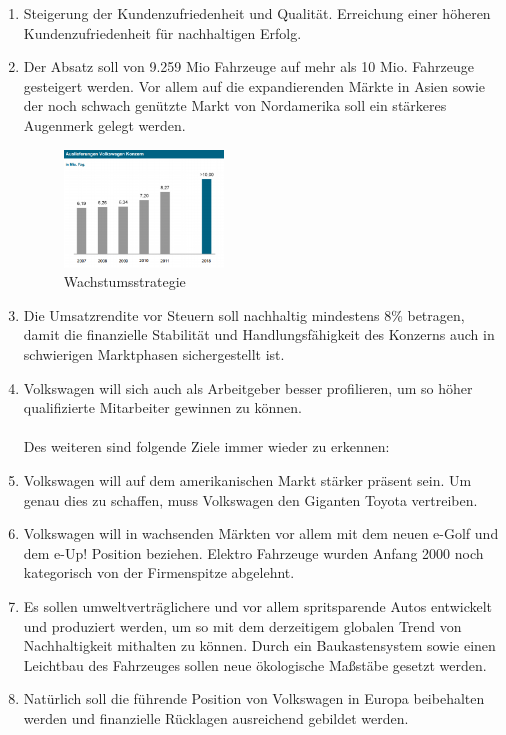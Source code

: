 \documentclass[12pt]{article}
\begin{document}
\begin{enumerate}
\item Steigerung der Kundenzufriedenheit und Qualität. Erreichung einer höheren Kundenzufriedenheit für nachhaltigen Erfolg.
\item Der Absatz soll von 9.259 Mio Fahrzeuge auf mehr als 10 Mio. Fahrzeuge gesteigert werden.  Vor allem auf die expandierenden Märkte in Asien sowie der noch schwach genützte Markt von Nordamerika soll ein stärkeres Augenmerk gelegt werden.
\begin{figure}[here!]
\centering
\includegraphics[width=0.4\textwidth]{images/strategie}
\caption{ Wachstumsstrategie \cite{vwamstrategie3}}
\end{figure}\FloatBarrier
\noindent
\item Die Umsatzrendite vor Steuern soll nachhaltig mindestens 8\% betragen, damit die finanzielle Stabilität und Handlungsfähigkeit des Konzerns auch in schwierigen Marktphasen sichergestellt ist. 
\item Volkswagen will sich auch als Arbeitgeber besser profilieren, um so höher qualifizierte Mitarbeiter gewinnen zu können.  \\\\
Des weiteren sind folgende Ziele immer wieder zu erkennen: \\
\item Volkswagen will auf dem amerikanischen Markt stärker präsent sein. Um genau dies zu schaffen, muss Volkswagen den Giganten Toyota vertreiben. \cite{ec1}
\item Volkswagen will in wachsenden Märkten vor allem mit dem neuen e-Golf und dem e-Up! Position beziehen. Elektro Fahrzeuge wurden Anfang 2000 noch kategorisch von der Firmenspitze abgelehnt. \cite{ec3} 
\item Es sollen umweltverträglichere und vor allem spritsparende Autos entwickelt und produziert werden, um so mit dem derzeitigem globalen Trend von Nachhaltigkeit mithalten zu können. Durch ein Baukastensystem sowie einen Leichtbau des Fahrzeuges sollen neue ökologische Maßstäbe gesetzt werden.
\item Natürlich soll die führende Position von Volkswagen in Europa beibehalten werden und finanzielle Rücklagen ausreichend gebildet werden.

\end{enumerate}
\end{document}
